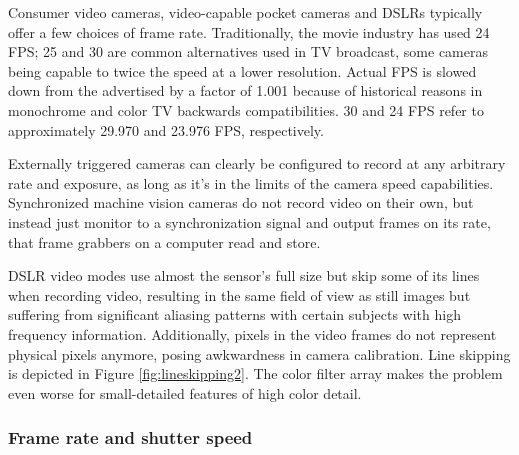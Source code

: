 
Consumer video cameras, video-capable pocket cameras and DSLRs typically offer a few choices of frame rate. Traditionally, the movie industry has used 24 FPS; 25 and 30 are common alternatives used in TV broadcast, some cameras being capable to twice the speed at a lower resolution.
Actual FPS is slowed down from the advertised by a factor of 1.001 because of historical reasons in monochrome and color TV backwards compatibilities.
30 and 24 FPS refer to approximately 29.970 and 23.976 FPS, respectively.
\cite{musburger2010single}

Externally triggered cameras can clearly be configured to record at any arbitrary rate and exposure, as long as it's in the limits of the camera speed capabilities.
Synchronized machine vision cameras do not record video on their own, but instead just monitor to a synchronization signal and output frames on its rate, that frame grabbers on a computer read and store.
\cite{hornberg2007handbook}


DSLR video modes use almost the sensor's full size but skip some of its lines when recording video, resulting in the same field of view as still images but suffering from significant aliasing patterns with certain subjects with high frequency information.
Additionally, pixels in the video frames do not represent physical pixels anymore, posing awkwardness in camera calibration.
Line skipping is depicted in Figure \ref{fig:lineskipping2}.
The color filter array makes the problem even worse for small-detailed features of high color detail.



\subsubsection{Frame rate and shutter speed} %


